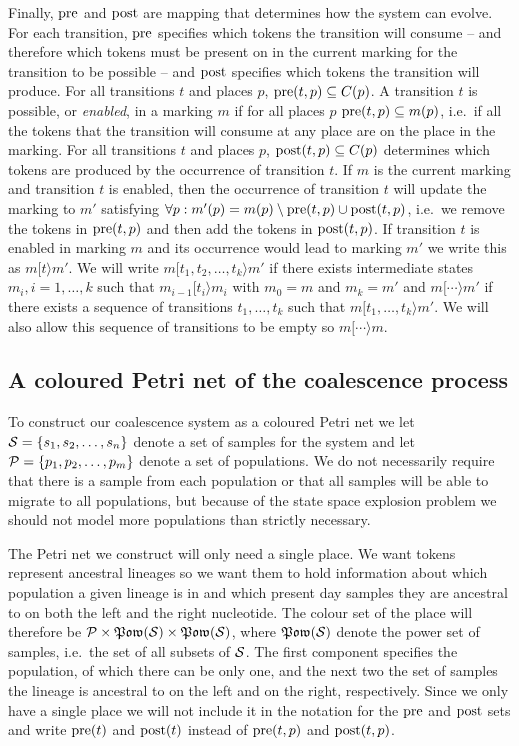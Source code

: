 Finally, $\operatorname{pre}$ and $\operatorname{post}$ are mapping that determines how the system can evolve. For each transition, $\operatorname{pre}$ specifies which tokens the transition will consume -- and therefore which tokens must be present on in the current marking for the transition to be possible -- and $\operatorname{post}$ specifies which tokens the transition will produce. For all transitions $t$ and places $p$, $\operatorname{pre}(t,p) \subseteq C(p)$. A transition $t$ is possible, or \emph{enabled}, in a marking $m$ if for all places $p$ $\operatorname{pre}(t,p)\subseteq m(p)$, i.e.\ if all the tokens that the transition will consume at any place are on the place in the marking. For all transitions $t$ and places $p$, $\operatorname{post}(t,p) \subseteq C(p)$ determines which tokens are produced by the occurrence of transition $t$. If $m$ is the current marking and transition $t$ is enabled, then the occurrence of transition $t$ will update the marking to $m'$ satisfying $\forall p: m'(p) = m(p) \setminus \operatorname{pre}(t,p) \cup \operatorname{post}(t,p)$, i.e.\ we remove the tokens in $\operatorname{pre}(t,p)$ and then add the tokens in $\operatorname{post}(t,p)$. If transition $t$ is enabled in marking $m$ and its occurrence would lead to marking $m'$ we write this as $m[t\rangle m'$. We will write $m[t_1,t_2,\ldots,t_k\rangle m'$ if there exists intermediate states $m_i,i=1,\ldots,k$ such that $m_{i-1}[t_i\rangle m_i$ with $m_0=m$ and $m_k=m'$ and $m[\cdots\rangle m'$ if there exists a sequence of transitions $t_1,\ldots,t_k$ such that $m[t_1,\ldots,t_k\rangle m'$. We will also allow this sequence of transitions to be empty so $m[\cdots\rangle m$.

\subsection{A coloured Petri net of the coalescence process}

To construct our coalescence system as a coloured Petri net we let $\mathcal{S}=\{s_1,s_2,\ldots,s_n\}$ denote a set of samples for the system and let $\mathcal{P}=\{p_1,p_2,\ldots,p_m\}$ denote a set of populations. We do not necessarily require that there is a sample from each population or that all samples will be able to migrate to all populations, but because of the state space explosion problem we should not model more populations than strictly necessary.

The Petri net we construct will only need a single place. We want tokens represent ancestral lineages so we want them to hold information about which population a given lineage is in and which present day samples they are ancestral to on both the left and the right nucleotide. The colour set of the place will therefore be $\mathcal{P}\times\mathfrak{Pow}(\mathcal{S})\times\mathfrak{Pow}(\mathcal{S})$, where $\mathfrak{Pow}(\mathcal{S})$ denote the power set of samples, i.e.\ the set of all subsets of $\mathcal{S}$. The first component specifies the population, of which there can be only one, and the next two the set of samples the lineage is ancestral to on the left and on the right, respectively. Since we only have a single place we will not include it in the notation for the $\operatorname{pre}$ and $\operatorname{post}$ sets and write $\operatorname{pre}(t)$ and $\operatorname{post}(t)$ instead of $\operatorname{pre}(t,p)$ and $\operatorname{post}(t,p)$.


